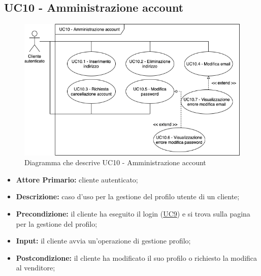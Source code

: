 \subsection{UC10 - Amministrazione account}
\label{UC10}
\begin{figure}[H]
    \centering
    \includegraphics[width=\linewidth]{res/images/UC/UC10.png}
    \caption{Diagramma che descrive UC10 - Amministrazione account} 
\end{figure}
\begin{itemize}
    \item \textbf{Attore Primario:} cliente autenticato;
    \item \textbf{Descrizione:} caso d'uso per la gestione del profilo utente di un cliente;
    \item \textbf{Precondizione:} il cliente ha eseguito il login (\hyperref[UC9]{UC9}) e si trova sulla pagina per la gestione del profilo;
    \item \textbf{Input:} il cliente avvia un'operazione di gestione profilo;
    \item \textbf{Postcondizione:} il cliente ha modificato il suo profilo o richiesto la modifica al venditore;
\end{itemize}

